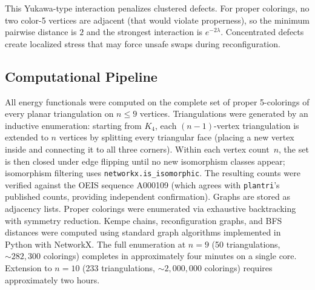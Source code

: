 This Yukawa-type interaction penalizes clustered defects.
For proper colorings, no two color-5 vertices are adjacent (that would
violate properness), so the minimum pairwise distance is $2$ and the
strongest interaction is $e^{-2\lambda}$.
Concentrated defects create localized stress that may force unsafe
swaps during reconfiguration.

\subsection{Computational Pipeline}\label{sec:pipeline}

All energy functionals were computed on the complete set of proper
5-colorings of every planar triangulation on $n \leq 9$ vertices.
Triangulations were generated by an inductive enumeration: starting
from $K_4$, each $(n{-}1)$-vertex triangulation is extended to $n$
vertices by splitting every triangular face (placing a new vertex
inside and connecting it to all three corners). Within each vertex
count~$n$, the set is then closed under edge flipping until no new
isomorphism classes appear; isomorphism filtering uses
\texttt{networkx.is\_isomorphic}. The resulting counts were verified
against the OEIS sequence A000109 (which agrees with
\texttt{plantri}'s published counts, providing independent
confirmation). Graphs are stored as adjacency lists. Proper colorings were enumerated
via exhaustive backtracking with symmetry reduction. Kempe chains,
reconfiguration graphs, and BFS distances were computed using standard
graph algorithms implemented in Python with NetworkX. The full
enumeration at $n = 9$ (50 triangulations, ${\sim}282{,}300$
colorings) completes in approximately four minutes on a single core.
Extension to $n = 10$ (233 triangulations, ${\sim}2{,}000{,}000$
colorings) requires approximately two hours.
